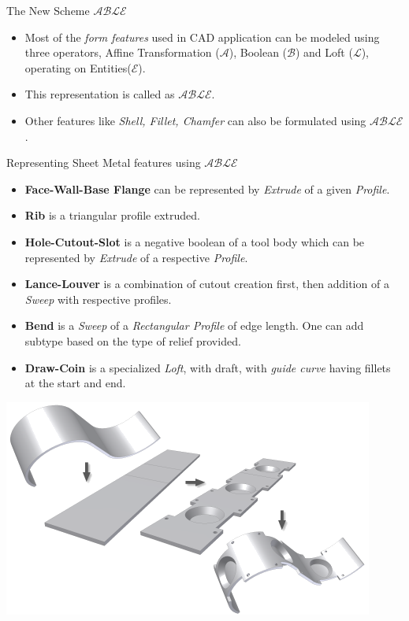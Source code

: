 \begin{frame}{The New Scheme $\mathcal{ABLE}$}
\begin{itemize}[noitemsep,label=\textbullet,topsep=2pt,parsep=2pt,partopsep=2pt]
\item Most of the {\em form features} used in CAD application can be modeled using  three operators, Affine Transformation ($\mathcal{A}$),  Boolean ($\mathcal{B}$) and Loft ($\mathcal{L}$), operating on Entities($\mathcal{E}$). 
\item This representation is called as {\bf $\mathcal{ABLE}$}.  
\item Other features like {\em Shell, Fillet, Chamfer} can also be formulated using {\bf $\mathcal{ABLE}$}. 
\end{itemize}
\end{frame}
\begin{frame}{Representing Sheet Metal features using  $\mathcal{ABLE}$}
\begin{itemize}[noitemsep,label=\textbullet,topsep=2pt,parsep=2pt,partopsep=2pt]
\item {\bf Face-Wall-Base Flange} can be represented by {\em Extrude} of a given {\em Profile}.
\item {\bf Rib} is a triangular profile extruded.
\item {\bf Hole-Cutout-Slot} is a negative boolean of a tool body which can be represented by  {\em Extrude} of a respective {\em Profile}.
\item {\bf Lance-Louver} is a combination of cutout creation first, then addition of a {\em Sweep} with respective profiles. 
\item {\bf Bend} is a {\em Sweep} of a {\em Rectangular  Profile}	 of edge length. One can add subtype based on the type of relief provided.
\item {\bf Draw-Coin} is a specialized {\em Loft}, with draft, with {\em guide curve} having fillets at the start and end.
\end{itemize}
\begin{center}\includegraphics[width=0.3\linewidth]{../Common/images/SheetMetalFeatures}\end{center}
\end{frame}

